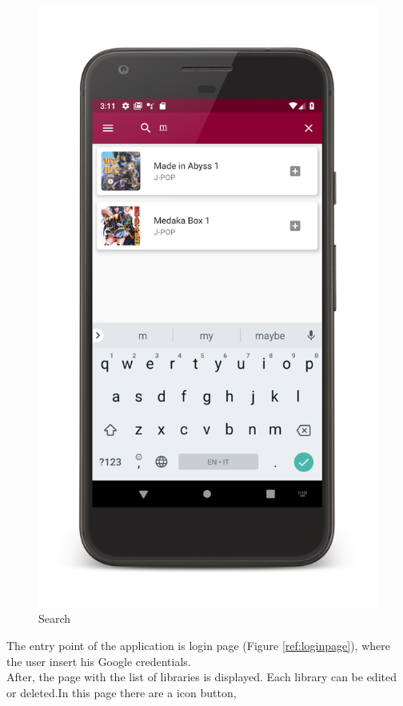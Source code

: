 \begin{figure}[!htb]
\begin{minipage}[b]{0.3\textwidth}
        \includegraphics[scale=0.09]{images/search-page.png}
        \caption{Search}
        \label{ref:search}
    \end{minipage}
\end{figure}
The entry point of the application is login page (Figure \ref{ref:loginpage}), 
where the user insert his Google credentials.\\ 
After, the page with the list of libraries is displayed. 
Each library can be edited or deleted.In this page there are a icon button, 
